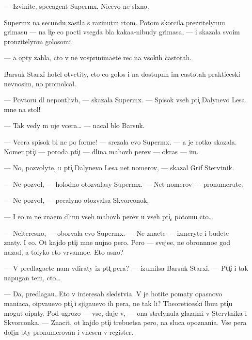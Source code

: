 \documentclass[12pt]{book}
\begin{document}
— Izvinite, specagent Superm{\yi}x. Nicevo ne sl{\yi}xno.

Superm{\yi}x na secundu zast{\yi}la s razinut{\yi}m rtom. Potom skorcila pre\-zri\-tely\-nu\-{\y}u grimasu — na li{\c}e {\y}e{\y}o pocti vsegda b{\yi}la kaka{\y}a-nibudy grimasa, — i skazala svo{\y}im pronzitelyn{\yi}m golosom:

— {\Y}a op{\ia}ty zab{\yi}la, cto v{\yi} ne vosprinima{\y}ete rec na v{\yi}sokih castotah.

Barsuk Starxi{\y} hotel otvetity, cto {\y}e{\y}o golos i na dostupn{\yi}h im castotah prakticeski nev{\yi}nosim, no promolcal.

— Povtor{\ia}{\y}u dl{\ia} nepon{\ia}tliv{\yi}h, — skazala Superm{\yi}x. — Spisok vseh pti{\c} Dalynevo Lesa mne na stol!

— Tak vedy m{\yi} uje vcera… — nacal b{\yi}lo Barsuk.

— Vcera spisok b{\yi}l ne po forme! — srezala {\y}evo Superm{\yi}x. — {\Y}a je cotko skazala. Nomer pti{\c}i — poroda pti{\c}i — dlina mahov{\yi}h per{\y}ev — okras — im{\ia}.

— No, pozvolyte, u pti{\c} Dalynevo Lesa net nomerov, — skazal Grif Sterv{\ia}tnik.

— Ne pozvol{\iu}, — holodno otozvalasy Superm{\yi}x. — Net nomerov — pronumeru{\y}te.

— Ne pozvol{\iu}, — pecalyno otozvalsa Skvorconok.

— I {\y}e{\x}o m{\yi} ne zna{\y}em dlinu vseh mahov{\yi}h per{\y}ev u vseh pti{\c}, potomu cto…

— Neiteresno, — oborvala {\y}evo Superm{\yi}x. — Ne zna{\y}ete — izmeryte i budete znaty. I {\y}e{\x}o. Ot kajdo{\y} pti{\c}i mne nujno pero. Pero — sveje{\y}e, ne obron{\e}nno{\y}e god nazad, a tolyko cto v{\yi}rvanno{\y}e. Eto {\y}asno?

— V{\yi} predlaga{\y}ete nam v{\yi}diraty iz pti{\c} per{\y}a? — izumilsa Barsuk Starxi{\y}. — Pti{\c}i i tak napugan{\yi} tem, cto…

— Da, predlaga{\y}u. Eto v interesah sledstvi{\y}a. V{\yi} je hotite po{\y}maty opasnovo maniaca, o{\x}ip{\yi}va{\y}u{\x}evo pti{\c} i sjiga{\y}u{\x}evo ih per{\y}a, ne tak li? Theoreticeski l{\iu}bu{\y}u pti{\c}u mogut o{\x}ipaty. Pod ugrozo{\y} — vse, daje v{\yi}, — ona strelynula glazami v Sterv{\ia}tnika i Skvorconka. — Znacit, ot kajdo{\y} pti{\c}i trebu{\y}etsa pero, na sluca{\y} opoznani{\y}a. Vse per{\y}a doljn{\yi} b{\yi}ty pronumerovan{\yi} i vnesen{\yi} v register.
\end{document}
